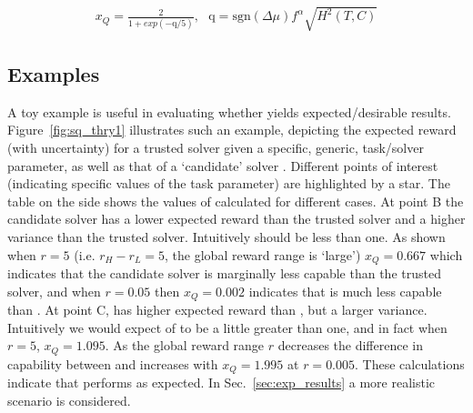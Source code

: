 \begin{align}
    x_{Q} = \frac{2}{1+exp(-\text{q}/5)}, \ \ \ %
    \text{q} = \text{sgn}(\Delta \mu)f^{\alpha}\sqrt{H^{2}(T,C)} \label{eq:SQ} %
\end{align}

\subsection{Examples}
A toy example is useful in evaluating whether \xQ{} yields expected/desirable results. Figure~\ref{fig:sq_thry1} illustrates such an example, depicting the expected reward (with uncertainty) for a trusted solver \solvestar{} given a specific, generic, task/solver parameter, as well as that of a `candidate' solver \solve. Different points of interest (indicating specific values of the task parameter) are highlighted by a star. The table on the side shows the values of \xQ{} calculated for different cases. At point B the candidate solver has a lower expected reward than the trusted solver and a higher variance than the trusted solver. Intuitively \xQ{} should be less than one. As shown when $r=5$ (i.e. $r_H-r_L=5$, the global reward range is `large') $x_Q=0.667$ which indicates that the candidate solver is marginally less capable than the trusted solver, and when $r=0.05$ then $x_Q=0.002$ indicates that \solve{} is much less capable than \solvestar. At point C, \solve{} has higher expected reward than \solvestar, but a larger variance. Intuitively we would expect \xQ{} of \solve{} to be a little greater than one, and in fact when $r=5$, $x_Q=1.095$. As the global reward range $r$ decreases the difference in capability between \solve{} and \solvestar{} increases with $x_Q=1.995$ at $r=0.005$. These calculations indicate that \xQ{} performs as expected. In Sec.~\ref{sec:exp_results} a more realistic scenario is considered. 

